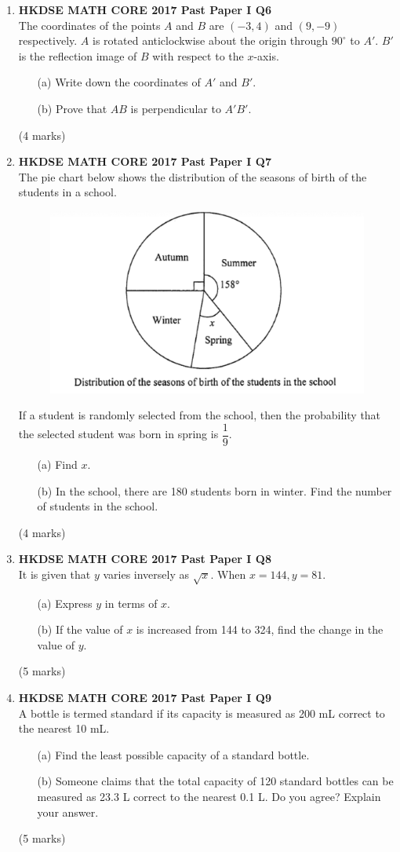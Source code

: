 \documentclass[12pt]{article}
\begin{document}
\begin{enumerate}
	\item \textbf{HKDSE MATH CORE 2017 Past Paper I Q6}\\
	The coordinates of the points $A$ and $B$ are $(-3, 4)$ and $(9, -9)$ respectively. $A$ is rotated anticlockwise about the origin through $90^\circ$ to $A'$. $B'$ is the reflection image of $B$ with respect to the $x$-axis.
	\begin{enumerate}
		\item[(a)] Write down the coordinates of $A'$ and $B'$.
		\item[(b)] Prove that $AB$ is perpendicular to $A'B'$.	
	\end{enumerate}
	(4 marks)

	\item \textbf{HKDSE MATH CORE 2017 Past Paper I Q7}\\
	The pie chart below shows the distribution of the seasons of birth of the students in a school.
	\begin{figure}[H]
		\centering
		\includegraphics[width = .3\linewidth]{2017Figure1.00}
	\end{figure}
	If a student is randomly selected from the school, then the probability that the selected student was born in spring is $\dfrac{1}{9}$.
	\begin{enumerate}
		\item[(a)] Find $x$.
		\item[(b)] In the school, there are 180 students born in winter. Find the number of students in the school.
	\end{enumerate}
	(4 marks)
	
	\item \textbf{HKDSE MATH CORE 2017 Past Paper I Q8}\\
	It is given that $y$ varies inversely as $\sqrt{x}$. When $x = 144, y = 81$.
	\begin{enumerate}
		\item[(a)] Express $y$ in terms of $x$.
		\item[(b)] If the value of $x$ is increased from 144 to 324, find the change in the value of $y$.
	\end{enumerate}
	(5 marks)	
	
	\item \textbf{HKDSE MATH CORE 2017 Past Paper I Q9}\\
	A bottle is termed standard if its capacity is measured as 200 mL correct to the nearest 10 mL.
	\begin{enumerate}
		\item[(a)] Find the least possible capacity of a standard bottle.
		\item[(b)] Someone claims that the total capacity of 120 standard bottles can be measured as 23.3 L correct to the nearest 0.1 L. Do you agree? Explain your answer.
	\end{enumerate}
	(5 marks)


\end{enumerate}
\end{document}
